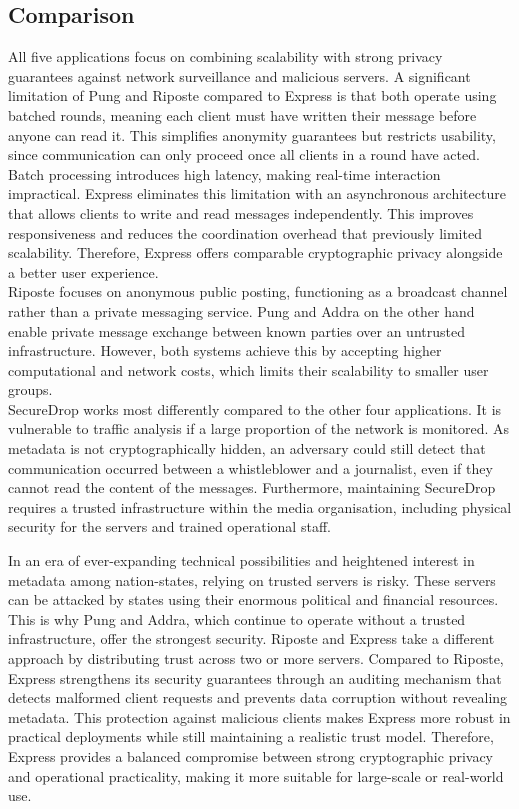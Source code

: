 \documentclass[a4paper]{article}
\begin{document}
\subsection{Comparison}
All five applications focus on combining scalability with strong privacy guarantees against network surveillance and malicious servers. A significant limitation of Pung and Riposte compared to Express is that both operate using batched rounds, meaning each client must have written their message before anyone can read it. This simplifies anonymity guarantees but restricts usability, since communication can only proceed once all clients in a round have acted. Batch processing introduces high latency, making real-time interaction impractical. Express eliminates this limitation with an asynchronous architecture that allows clients to write and read messages independently. This improves responsiveness and reduces the coordination overhead that previously limited scalability. Therefore, Express offers comparable cryptographic privacy alongside a better user experience. \\
Riposte focuses on anonymous public posting, functioning as a broadcast channel rather than a private messaging service. Pung and Addra on the other hand enable private message exchange between known parties over an untrusted infrastructure. However, both systems achieve this by accepting higher computational and network costs, which limits their scalability to smaller user groups. \\
SecureDrop works most differently compared to the other four applications. It is vulnerable to traffic analysis if a large proportion of the network is monitored. As metadata is not cryptographically hidden, an adversary could still detect that communication occurred between a whistleblower and a journalist, even if they cannot read the content of the messages. Furthermore, maintaining SecureDrop requires a trusted infrastructure within the media organisation, including physical security for the servers and trained operational staff.

In an era of ever-expanding technical possibilities and heightened interest in metadata among nation-states, relying on trusted servers is risky. These servers can be attacked by states using their enormous political and financial resources. This is why Pung and Addra, which continue to operate without a trusted infrastructure, offer the strongest security. Riposte and Express take a different approach by distributing trust across two or more servers. Compared to Riposte, Express strengthens its security guarantees through an auditing mechanism that detects malformed client requests and prevents data corruption without revealing metadata.
This protection against malicious clients makes Express more robust in practical deployments while still maintaining a realistic trust model. Therefore, Express provides a balanced compromise between strong cryptographic privacy and operational practicality, making it more suitable for large-scale or real-world use.
\end{document}
